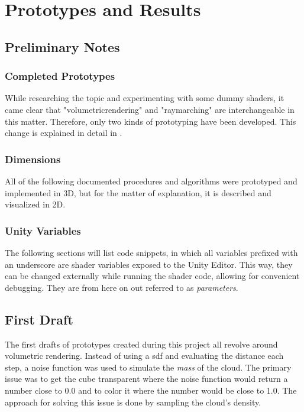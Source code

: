 \section{Prototypes and Results}

\subsection{Preliminary Notes}
\subsubsection{Completed Prototypes}
While researching the topic and experimenting with some dummy shaders, it came clear that "\gls{volumetricrendering}" and "\gls{raymarching}" are interchangeable in this matter.
Therefore, only two kinds of prototyping have been developed. This change is explained in detail in .

\subsubsection{Dimensions}
All of the following documented procedures and algorithms were prototyped and implemented in 3D, but for the matter of explanation, it is described and visualized in 2D.

\subsubsection{Unity Variables}
The following sections will list code snippets, in which all variables prefixed with an underscore are shader variables exposed to the Unity Editor. This way, they can be changed externally while running the shader code, allowing for convenient debugging.
They are from here on out referred to as \textit{\gls{parameters}}.

\clearpage
\subsection{First Draft}
The first drafts of prototypes created during this project all revolve around volumetric rendering. 
Instead of using a \gls{sdf} and evaluating the distance each step, a noise function was used to simulate the \textit{mass} of the cloud. 
The primary issue was to get the cube transparent where the noise function would return a number close to 0.0 and to color it where the number would be close to 1.0.
The approach for solving this issue is done by sampling the cloud's density.


